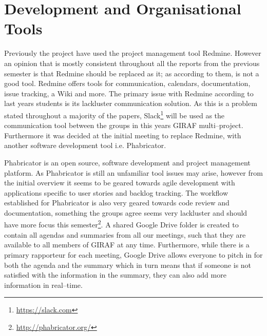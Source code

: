 \section{Development and Organisational Tools}
Previously the project have used the project management tool Redmine.
However an opinion that is mostly consistent throughout all the reports from the previous semester is that Redmine should be replaced as it;
as according to them, is not a good tool.
Redmine offers tools for communication, calendars, documentation, issue tracking, a Wiki and more.
The primary issue with Redmine according to last years students is its lackluster communication solution.
As this is a problem stated throughout a majority of the papers, Slack\footnote{\url{https://slack.com}} will be used as the communication tool between the groups in this years GIRAF multi--project.
Furthermore it was decided at the initial meeting to replace Redmine, with another software development tool i.e. Phabricator.

Phabricator is an open source, software development and project management platform.
As Phabricator is still an unfamiliar tool issues may arise, however from the initial overview it seems to be geared towards agile development with applications specific to user stories and backlog tracking.
The workflow established for Phabricator is also very geared towards code review and documentation, something the groups agree seems very lackluster and should have more focus this semester\footnote{\url{http://phabricator.org/}}.
A shared Google Drive folder is created to contain all agendas and summaries from all our meetings, such that they are available to all members of GIRAF at any time.
Furthermore, while there is a primary rapporteur for each meeting, Google Drive allows everyone to pitch in for both the agenda and the summary which in turn means that if someone is not satisfied with the information in the summary, they can also add more information in real--time.


